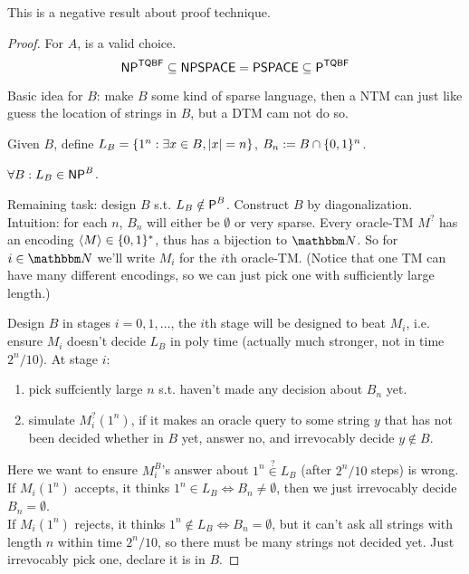\documentclass{article}
\begin{document}
This is a negative result about proof technique.

\begin{proof}
  For \(A\),  is a valid choice.
  \[ \NP^\prob{TQBF} \subseteq \NPSPACE = \PSPACE \subseteq \P^\prob{TQBF} \]

  Basic idea for \(B\): make \(B\) some kind of sparse language, then a NTM can just like guess the location of strings in \(B\), but a DTM cam not do so.

  Given \(B\), define \(L_B = \setof{1^n : \exists x \in B, |x| = n}\), \(B_n := B \cap \setof{0, 1}^n\).

  \begin{claim}
    \(\forall B: L_B \in \NP^B\).
  \end{claim}

  Remaining task: design \(B\) s.t. \(L_B \notin \P^B\).
  Construct \(B\) by diagonalization.
  Intuition: for each \(n\), \(B_n\) will either be \(\emptyset\) or very sparse.
  Every oracle-TM \(M^?\) has an encoding \(\encoding{M} \in \setof{0, 1}^*\), thus has a bijection to \(\N\). So for \(i \in \N\) we'll write \(M_i\) for the \(i\)th oracle-TM.
  (Notice that one TM can have many different encodings, so we can just pick one with sufficiently large length.)

  Design \(B\) in stages \(i = 0, 1, \ldots\), the \(i\)th stage will be designed to beat \(M_i\), i.e. ensure \(M_i\) doesn't decide \(L_B\) in poly time (actually much stronger, not in time \(2^n/10\)).
  At stage \(i\):
  \begin{enumerate}
    \item pick suffciently large \(n\) s.t. haven't made any decision about \(B_n\) yet.
    \item simulate \(M_i^?(1^n)\), if it makes an oracle query to some string \(y\) that has not been decided whether in \(B\) yet, answer no, and irrevocably decide \(y \notin B\).
  \end{enumerate}

  Here we want to ensure \(M_i^B\)'s answer about \(1^n \overset{?}{\in} L_B\) (after \(2^n/10\) steps) is wrong. \\ \indent
  If \(M_i(1^n)\) accepts, it thinks \(1^n \in L_B \iff B_n \neq \emptyset\), then we just irrevocably decide \(B_n = \emptyset\). \\ \indent
  If \(M_i(1^n)\) rejects, it thinks \(1^n \notin L_B \iff B_n = \emptyset\), but it can't ask all strings with length \(n\) within time \(2^n/10\), so there must be many strings not decided yet. Just irrevocably pick one, declare it is in \(B\).
\end{proof}
\end{document}
